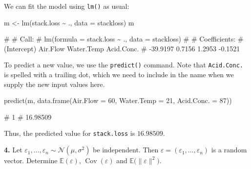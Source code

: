 \documentclass[
  a4paper,
]{article}
\newenvironment{Shaded}{\begin{snugshade}}{\end{snugshade}}
\newcommand{\AttributeTok}[1]{\textcolor[rgb]{0.77,0.63,0.00}{#1}}
\newcommand{\DecValTok}[1]{\textcolor[rgb]{0.00,0.00,0.81}{#1}}
\newcommand{\FunctionTok}[1]{\textcolor[rgb]{0.00,0.00,0.00}{#1}}
\newcommand{\NormalTok}[1]{#1}
\newcommand{\OtherTok}[1]{\textcolor[rgb]{0.56,0.35,0.01}{#1}}
\newcommand{\SpecialCharTok}[1]{\textcolor[rgb]{0.00,0.00,0.00}{#1}}
\theoremstyle{definition}
\theoremstyle{definition}
\theoremstyle{definition}
\theoremstyle{definition}
\theoremstyle{remark}
\begin{document}
\begin{myanswers}
We can fit the model using \texttt{lm()} as usual:

\begin{Shaded}
\begin{Highlighting}[]
\NormalTok{m }\OtherTok{\textless{}{-}} \FunctionTok{lm}\NormalTok{(stack.loss }\SpecialCharTok{\textasciitilde{}}\NormalTok{ ., }\AttributeTok{data =}\NormalTok{ stackloss)}
\NormalTok{m}
\end{Highlighting}
\end{Shaded}

\begin{Shaded}
\begin{Highlighting}[]
\NormalTok{\# }
\NormalTok{\# Call:}
\NormalTok{\# lm(formula = stack.loss \textasciitilde{} ., data = stackloss)}
\NormalTok{\# }
\NormalTok{\# Coefficients:}
\NormalTok{\# (Intercept)     Air.Flow   Water.Temp   Acid.Conc.  }
\NormalTok{\#    {-}39.9197       0.7156       1.2953      {-}0.1521}
\end{Highlighting}
\end{Shaded}

To predict a new value, we use the \texttt{predict()} command. Note that
\texttt{Acid.Conc.} is spelled with a trailing dot, which we need to include
in the name when we supply the new input values here.

\begin{Shaded}
\begin{Highlighting}[]
\FunctionTok{predict}\NormalTok{(m, }\FunctionTok{data.frame}\NormalTok{(}\AttributeTok{Air.Flow =} \DecValTok{60}\NormalTok{, }\AttributeTok{Water.Temp =} \DecValTok{21}\NormalTok{, }\AttributeTok{Acid.Conc. =} \DecValTok{87}\NormalTok{))}
\end{Highlighting}
\end{Shaded}

\begin{Shaded}
\begin{Highlighting}[]
\NormalTok{\#        1 }
\NormalTok{\# 16.98509}
\end{Highlighting}
\end{Shaded}

Thus, the predicted value for \texttt{stack.loss} is \(16.98509\).

\end{myanswers}

\textbf{4.} Let \(\varepsilon_1, \ldots, \varepsilon_n \sim \mathcal{N}(\mu, \sigma^2)\) be independent.
Then \(\varepsilon= (\varepsilon_1, \ldots, \varepsilon_n)\) is a random vector. Determine
\(\mathbb{E}(\varepsilon)\), \(\mathop{\mathrm{Cov}}(\varepsilon)\) and \(\mathbb{E}\bigl( \|\varepsilon\|^2 \bigr)\).
\end{document}
